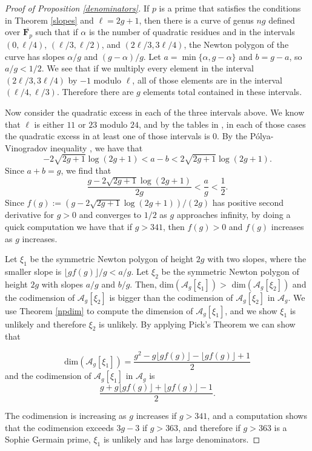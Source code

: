 \documentclass{article}
\theoremstyle{remark}
\theoremstyle{definition}
\begin{document}
\begin{proof}[Proof of Proposition \ref{denominators}]
    If $p$ is a prime that satisfies the conditions in Theorem \ref{slopes} and $\ell = 2g+1$, then there is a curve of genus $ng$ defined over $\overline{\mathbf{F}_p}$ such that if $\alpha$ is the number of quadratic residues and in the intervals $(0,\ell/4)$, $(\ell/3,\ell/2)$, and $(2\ell/3,3\ell/4)$, the Newton polygon of the curve has slopes $\alpha/g$ and $(g-\alpha)/g$. Let $a = \min{\{\alpha,g-\alpha\}}$ and $b = g-a$, so $a/g < 1/2$. We see that if we multiply every element in the interval $(2\ell/3,3\ell/4)$ by $-1$ modulo $\ell$, all of those elements are in the interval $(\ell/4,\ell/3)$. Therefore there are $g$ elements total contained in these intervals.
    
    Now consider the quadratic excess in each of the three intervals above. We know that $\ell$ is either $11$ or $23$ modulo $24$, and by the tables in \cite[Section 3]{johnson_symmetries_1977}, in each of those cases the quadratic excess in at least one of those intervals is $0$. By the Pólya-Vinogradov inequality \cite[Chapter 23]{multnumtheory}, we have that \[-2\sqrt{2g+1}\log{(2g+1)} < a-b < 2\sqrt{2g+1}\log{(2g+1)}.\] Since $a+b = g$, we find that \[\frac{g-2\sqrt{2g+1}\log{(2g+1)}}{2g} < \frac{a}{g} < \frac{1}{2}.\] Since $f(g) := (g - 2\sqrt{2g+1}\log{(2g+1)})/(2g)$ has positive second derivative for $g > 0$ and converges to $1/2$ as $g$ approaches infinity, by doing a quick computation we have that if $g > 341$, then $f(g) > 0$ and $f(g)$ increases as $g$ increases.
    
    Let $\xi_1$ be the symmetric Newton polygon of height $2g$ with two slopes, where the smaller slope is $\lfloor gf(g) \rfloor / g < a/g$. Let $\xi_2$ be the symmetric Newton polygon of height $2g$ with slopes $a/g$ and $b/g$. Then, dim$(\mathcal{A}_g[\xi_1]) > $ dim$(\mathcal{A}_g[\xi_2])$ and the codimension of $\mathcal{A}_g[\xi_2]$ is bigger than the codimension of $\mathcal{A}_g[\xi_2]$ in $\mathcal{A}_g$. We use Theorem \ref{npdim} to compute the dimension of $\mathcal{A}_g[\xi_1]$, and we show $\xi_1$ is unlikely and therefore $\xi_2$ is unlikely. By applying Pick's Theorem we can show that 
    
    \[\textrm{dim}(\mathcal{A}_g[\xi_1]) = \frac{g^2-g\lfloor gf(g) \rfloor -\lfloor gf(g) \rfloor+1}{2}\] and the codimension of $\mathcal{A}_g[\xi_1]$ in $\mathcal{A}_g$ is \[\frac{g+g\lfloor gf(g) \rfloor+\lfloor gf(g) \rfloor-1}{2}.\]
    
    The codimension is increasing as $g$ increases if $g > 341$, and a computation shows that the codimension exceeds $3g-3$ if $g > 363$, and therefore if $g > 363$ is a Sophie Germain prime, $\xi_1$ is unlikely and has large denominators.
    
\end{proof}
\end{document}
